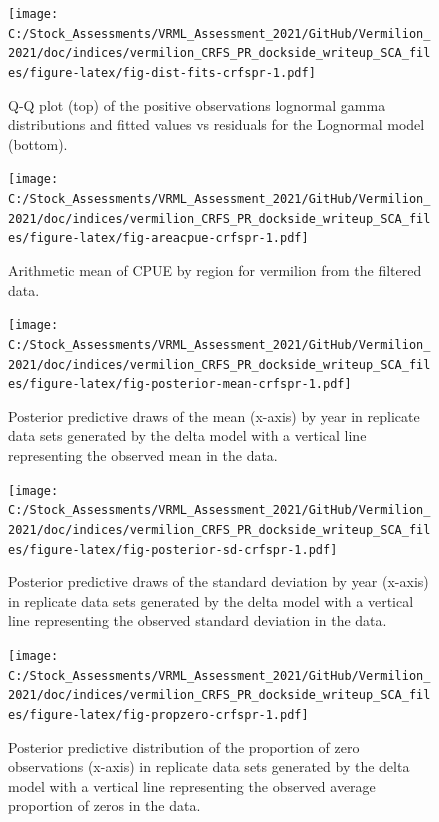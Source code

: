 \documentclass[11pt,
  english,
]{article}
\begin{document}
\FloatBarrier

\begin{figure}
\centering
\texttt{[image: C:/Stock\_Assessments/VRML\_Assessment\_2021/GitHub/Vermilion\_2021/doc/indices/vermilion\_CRFS\_PR\_dockside\_writeup\_SCA\_files/figure-latex/fig-dist-fits-crfspr-1.pdf]}
\caption{\label{fig:fig-dist-fits-crfspr}Q-Q plot (top) of the positive observations lognormal gamma distributions and fitted values vs residuals for the Lognormal model (bottom).}
\end{figure}

\begin{figure}
\centering
\texttt{[image: C:/Stock\_Assessments/VRML\_Assessment\_2021/GitHub/Vermilion\_2021/doc/indices/vermilion\_CRFS\_PR\_dockside\_writeup\_SCA\_files/figure-latex/fig-areacpue-crfspr-1.pdf]}
\caption{\label{fig:fig-areacpue-crfspr}Arithmetic mean of CPUE by region for vermilion from the filtered data.}
\end{figure}

\begin{figure}
\centering
\texttt{[image: C:/Stock\_Assessments/VRML\_Assessment\_2021/GitHub/Vermilion\_2021/doc/indices/vermilion\_CRFS\_PR\_dockside\_writeup\_SCA\_files/figure-latex/fig-posterior-mean-crfspr-1.pdf]}
\caption{\label{fig:fig-posterior-mean-crfspr}Posterior predictive draws of the mean (x-axis) by year in replicate data sets generated by the delta model with a vertical line representing the observed mean in the data.}
\end{figure}

\FloatBarrier

\begin{figure}
\centering
\texttt{[image: C:/Stock\_Assessments/VRML\_Assessment\_2021/GitHub/Vermilion\_2021/doc/indices/vermilion\_CRFS\_PR\_dockside\_writeup\_SCA\_files/figure-latex/fig-posterior-sd-crfspr-1.pdf]}
\caption{\label{fig:fig-posterior-sd-crfspr}Posterior predictive draws of the standard deviation by year (x-axis) in replicate data sets generated by the delta model with a vertical line representing the observed standard deviation in the data.}
\end{figure}

\begin{figure}
\centering
\texttt{[image: C:/Stock\_Assessments/VRML\_Assessment\_2021/GitHub/Vermilion\_2021/doc/indices/vermilion\_CRFS\_PR\_dockside\_writeup\_SCA\_files/figure-latex/fig-propzero-crfspr-1.pdf]}
\caption{\label{fig:fig-propzero-crfspr}Posterior predictive distribution of the proportion of zero observations (x-axis) in replicate data sets generated by the delta model with a vertical line representing the observed average proportion of zeros in the data.}
\end{figure}
\end{document}

